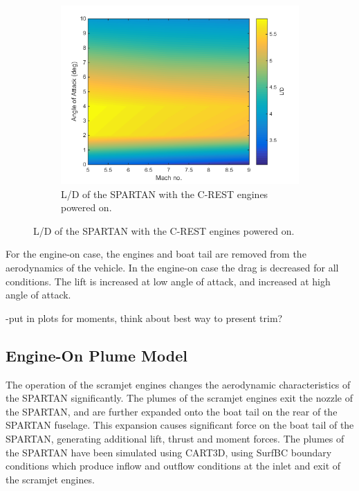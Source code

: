 \begin{figure}
\begin{subfigure}{.5\textwidth}
	\label{fig:Cd-EngineOn}
\end{subfigure}
\begin{subfigure}{.5\textwidth}
	\centering
	\includegraphics[width=0.99\linewidth]{figures/3_vehicle_design/LD-EngineOn}
	\caption{L/D of the SPARTAN with the C-REST engines powered on.}
	\label{fig:LD-EngineOn}
\end{subfigure}
\end{figure}

For the engine-on case, the engines and boat tail are removed from the aerodynamics of the vehicle. In the engine-on case the drag is decreased for all conditions. The lift is increased at low angle of attack, and increased at high angle of attack.


-put in plots for moments, think about best way to present trim?

\subsection{Engine-On Plume Model}\label{sec:engine-on}

The operation of the scramjet engines changes the aerodynamic characteristics of the SPARTAN significantly. 
The plumes of the scramjet engines exit the nozzle of the SPARTAN, and are further expanded onto the boat tail on the rear of the SPARTAN fuselage. This expansion causes significant force on the boat tail of the SPARTAN, generating additional lift, thrust and moment forces. The plumes of the SPARTAN have been simulated using CART3D, using SurfBC boundary conditions which produce inflow and outflow conditions at the inlet and exit of the scramjet engines\cite{Pandya2004}. 

